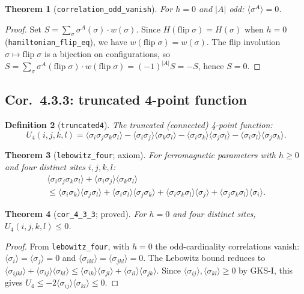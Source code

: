 \documentclass[a4paper,11pt]{article}
\newtheorem{theorem}{Theorem}
\newtheorem{definition}[theorem]{Definition}
\begin{document}
\begin{theorem}[\texttt{correlation\_odd\_vanish}]
For $h = 0$ and $|A|$ odd: $\langle\sigma^A\rangle = 0$.
\end{theorem}

\begin{proof}
Set $S = \sum_\sigma \sigma^A(\sigma) \cdot w(\sigma)$.
Since $H(\mathrm{flip}\;\sigma) = H(\sigma)$ when $h = 0$
(\texttt{hamiltonian\_flip\_eq}), we have $w(\mathrm{flip}\;\sigma) = w(\sigma)$.
The flip involution $\sigma \mapsto \mathrm{flip}\;\sigma$ is a bijection on
configurations, so
$S = \sum_\sigma \sigma^A(\mathrm{flip}\;\sigma) \cdot w(\mathrm{flip}\;\sigma)
   = (-1)^{|A|} S = -S$,
hence $S = 0$.
\end{proof}

\subsection{Cor.~4.3.3: truncated 4-point function}

\begin{definition}[\texttt{truncated4}]
The truncated (connected) 4-point function:
\[
  U_4(i,j,k,l) = \langle\sigma_i\sigma_j\sigma_k\sigma_l\rangle
  - \langle\sigma_i\sigma_j\rangle\langle\sigma_k\sigma_l\rangle
  - \langle\sigma_i\sigma_k\rangle\langle\sigma_j\sigma_l\rangle
  - \langle\sigma_i\sigma_l\rangle\langle\sigma_j\sigma_k\rangle.
\]
\end{definition}

\begin{theorem}[\texttt{lebowitz\_four}; axiom]
For ferromagnetic parameters with $h \ge 0$ and four distinct sites $i,j,k,l$:
\begin{multline*}
  \langle\sigma_i\sigma_j\sigma_k\sigma_l\rangle
  + \langle\sigma_i\sigma_j\rangle\langle\sigma_k\sigma_l\rangle \\
  \le \langle\sigma_i\sigma_k\rangle\langle\sigma_j\sigma_l\rangle
  + \langle\sigma_i\sigma_l\rangle\langle\sigma_j\sigma_k\rangle
  + \langle\sigma_i\sigma_k\sigma_l\rangle\langle\sigma_j\rangle
  + \langle\sigma_j\sigma_k\sigma_l\rangle\langle\sigma_i\rangle.
\end{multline*}
\end{theorem}

\begin{theorem}[\texttt{cor\_4\_3\_3}; proved]
For $h = 0$ and four distinct sites, $U_4(i,j,k,l) \le 0$.
\end{theorem}

\begin{proof}
From \texttt{lebowitz\_four}, with $h = 0$ the odd-cardinality correlations
vanish: $\langle\sigma_i\rangle = \langle\sigma_j\rangle = 0$ and
$\langle\sigma_{ikl}\rangle = \langle\sigma_{jkl}\rangle = 0$.
The Lebowitz bound reduces to
$\langle\sigma_{ijkl}\rangle + \langle\sigma_{ij}\rangle\langle\sigma_{kl}\rangle
\le \langle\sigma_{ik}\rangle\langle\sigma_{jl}\rangle
  + \langle\sigma_{il}\rangle\langle\sigma_{jk}\rangle$.
Since $\langle\sigma_{ij}\rangle, \langle\sigma_{kl}\rangle \ge 0$ by GKS-I,
this gives $U_4 \le -2\langle\sigma_{ij}\rangle\langle\sigma_{kl}\rangle \le 0$.
\end{proof}
\end{document}
